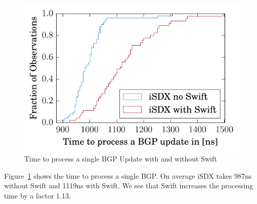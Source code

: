 \begin{figure}[h]
\center
\includegraphics[scale = 1]{Figures/results_overhead.pdf}
\caption{Time to process a single BGP Update with and without Swift}
\label{fig:swiftoverhead}
\end{figure}

Figure~\ref{fig:swiftoverhead} shows the time to process a single BGP. On average iSDX takes 987ns without Swift and 1119ns with Swift. We see that Swift increases the processing time by a factor 1.13.

\newpage